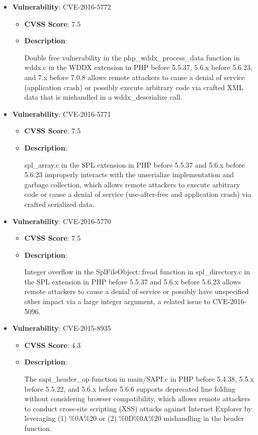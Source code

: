 \documentclass{article}
\begin{document}
\begin{itemize}
        \item \textbf{Vulnerability}: CVE-2016-5772
        \begin{itemize}
            \item \textbf{CVSS Score}:  7.5 
            \item \textbf{Description}:
            \parbox[t]{0.9\linewidth}{
                \ttfamily Double free vulnerability in the php\_wddx\_process\_data function in wddx.c in the WDDX extension in PHP before 5.5.37, 5.6.x before 5.6.23, and 7.x before 7.0.8 allows remote attackers to cause a denial of service (application crash) or possibly execute arbitrary code via crafted XML data that is mishandled in a wddx\_deserialize call.
            }
        \end{itemize}
    
        \item \textbf{Vulnerability}: CVE-2016-5771
        \begin{itemize}
            \item \textbf{CVSS Score}:  7.5 
            \item \textbf{Description}:
            \parbox[t]{0.9\linewidth}{
                \ttfamily spl\_array.c in the SPL extension in PHP before 5.5.37 and 5.6.x before 5.6.23 improperly interacts with the unserialize implementation and garbage collection, which allows remote attackers to execute arbitrary code or cause a denial of service (use-after-free and application crash) via crafted serialized data.
            }
        \end{itemize}
    
        \item \textbf{Vulnerability}: CVE-2016-5770
        \begin{itemize}
            \item \textbf{CVSS Score}:  7.5 
            \item \textbf{Description}:
            \parbox[t]{0.9\linewidth}{
                \ttfamily Integer overflow in the SplFileObject::fread function in spl\_directory.c in the SPL extension in PHP before 5.5.37 and 5.6.x before 5.6.23 allows remote attackers to cause a denial of service or possibly have unspecified other impact via a large integer argument, a related issue to CVE-2016-5096.
            }
        \end{itemize}
    
        \item \textbf{Vulnerability}: CVE-2015-8935
        \begin{itemize}
            \item \textbf{CVSS Score}:  4.3 
            \item \textbf{Description}:
            \parbox[t]{0.9\linewidth}{
                \ttfamily The sapi\_header\_op function in main/SAPI.c in PHP before 5.4.38, 5.5.x before 5.5.22, and 5.6.x before 5.6.6 supports deprecated line folding without considering browser compatibility, which allows remote attackers to conduct cross-site scripting (XSS) attacks against Internet Explorer by leveraging (1) \%0A\%20 or (2) \%0D\%0A\%20 mishandling in the header function.
            }
        \end{itemize}
    

\end{itemize}
\end{document}
